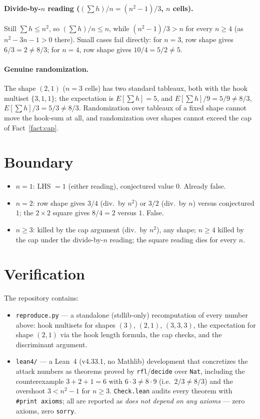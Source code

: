 \documentclass[11pt]{article}
\begin{document}
\paragraph{Divide-by-$n$ reading ($(\sum h)/n = (n^2-1)/3$, $n$ cells).}
Still $\sum h \le n^2$, so $(\sum h)/n \le n$, while $(n^2-1)/3 > n$ for every
$n \ge 4$ (as $n^2 - 3n - 1 > 0$ there). Small cases fail directly: for $n = 3$,
row shape gives $6/3 = 2 \ne 8/3$; for $n = 4$, row shape gives $10/4 = 5/2 \ne 5$.

\paragraph{Genuine randomization.}
The shape $(2,1)$ ($n = 3$ cells) has two standard tableaux, both with the hook
multiset $\{3,1,1\}$; the expectation is $E[\sum h] = 5$, and
$E[\sum h]/9 = 5/9 \ne 8/3$, $E[\sum h]/3 = 5/3 \ne 8/3$. Randomization over
tableaux of a fixed shape cannot move the hook-sum at all, and randomization
over shapes cannot exceed the cap of Fact~\ref{fact:cap}.

\section{Boundary}

\begin{itemize}
\item $n = 1$: LHS $= 1$ (either reading), conjectured value $0$. Already false.
\item $n = 2$: row shape gives $3/4$ (div.\ by $n^2$) or $3/2$ (div.\ by $n$)
  versus conjectured $1$; the $2\times 2$ square gives $8/4 = 2$ versus $1$.
  False.
\item $n \ge 3$: killed by the cap argument (div.\ by $n^2$), any shape;
  $n \ge 4$ killed by the cap under the divide-by-$n$ reading; the square
  reading dies for every $n$.
\end{itemize}

\section{Verification}

The repository contains:
\begin{itemize}
\item \texttt{reproduce.py} --- a standalone (stdlib-only) recomputation of every
  number above: hook multisets for shapes $(3)$, $(2,1)$, $(3,3,3)$, the
  expectation for shape $(2,1)$ via the hook length formula, the cap checks, and
  the discriminant argument.
\item \texttt{lean4/} --- a Lean~4 (v4.33.1, no Mathlib) development that
  concretizes the attack numbers as theorems proved by \texttt{rfl}/\texttt{decide}
  over \texttt{Nat}, including the counterexample $3+2+1 = 6$ with
  $6 \cdot 3 \ne 8 \cdot 9$ (i.e.\ $2/3 \ne 8/3$) and the overshoot
  $3 < n^2 - 1$ for $n \ge 3$. \texttt{Check.lean} audits every theorem with
  \texttt{\#print axioms}; all are reported as \emph{does not depend on any
  axioms} --- zero axioms, zero \texttt{sorry}.
\end{itemize}
\end{document}

